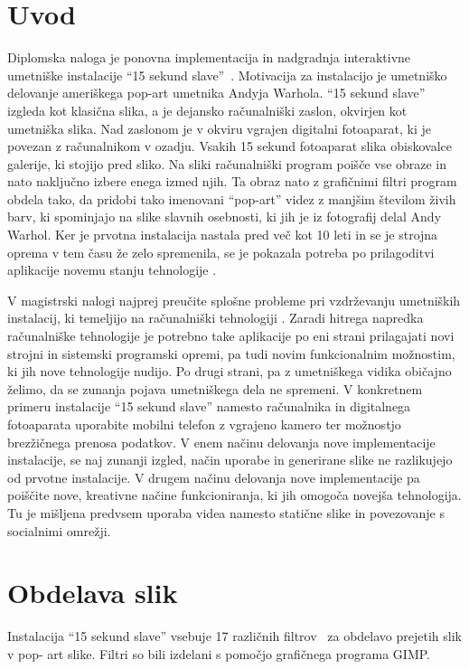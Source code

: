 \chapter{Uvod}
Diplomska naloga je ponovna implementacija in nadgradnja interaktivne
umetniške instalacije ``15 sekund slave''~\cite{15secLeonardo}. Motivacija za
instalacijo je umetniško delovanje ameriškega pop-art umetnika Andyja Warhola.
``15 sekund slave'' izgleda kot klasična slika, a je dejansko računalniški
zaslon, okvirjen kot umetniška slika. Nad zaslonom je v okviru vgrajen
digitalni fotoaparat, ki je povezan z računalnikom v ozadju. Vsakih 15 sekund
fotoaparat slika obiskovalce galerije, ki stojijo pred sliko. Na sliki
računalniški program poišče vse obraze in nato naključno izbere enega izmed
njih. Ta obraz nato z grafičnimi filtri program obdela tako, da pridobi tako
imenovani ``pop-art'' videz z manjšim številom živih barv, ki spominjajo na
slike slavnih osebnosti, ki jih je iz fotografij delal Andy Warhol. Ker je
prvotna instalacija nastala pred več kot 10 leti in se je strojna oprema v tem
času že zelo spremenila, se je pokazala potreba po prilagoditvi aplikacije
novemu stanju tehnologije \cite{trifonova}.

V magistrski nalogi najprej preučite splošne probleme pri vzdrževanju
umetniških instalacij, ki temeljijo na računalniški tehnologiji
\cite{miller1,miller2,digitalartconservation}. Zaradi hitrega napredka
računalniške tehnologije je potrebno take aplikacije po eni strani prilagajati
novi strojni in sistemski programski opremi, pa tudi novim funkcionalnim
možnostim, ki jih nove tehnologije nudijo. Po drugi strani, pa z umetniškega
vidika običajno želimo, da se zunanja pojava umetniškega dela ne spremeni. V
konkretnem primeru instalacije ``15 sekund slave'' namesto računalnika in
digitalnega fotoaparata uporabite mobilni telefon z vgrajeno kamero ter
možnostjo brezžičnega prenosa podatkov. V enem načinu delovanja nove
implementacije instalacije, se naj zunanji izgled, način uporabe in generirane
slike ne razlikujejo od prvotne instalacije. V drugem načinu delovanja nove
implementacije pa poiščite nove, kreativne načine funkcioniranja, ki jih
omogoča novejša tehnologija. Tu je mišljena predvsem uporaba videa namesto
statične slike in povezovanje s socialnimi omrežji.


\chapter{Obdelava slik}
Instalacija ``15 sekund slave'' vsebuje 17 različnih
filtrov~\cite[Poglavje~5]{diplomskaSamoJuvan} za obdelavo prejetih slik v pop-
art slike. Filtri so bili izdelani s pomočjo grafičnega programa GIMP.


